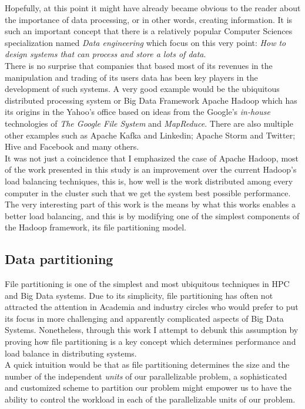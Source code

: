 Hopefully, at this point it might have already became obvious to the reader
about the importance of data processing, or in other words, creating
information. It is such an important concept that there is a relatively popular
Computer Sciences specialization named \textit{Data engineering} which focus on
this very point: \textit{How to design systems that can process and store a
lots of data}. \\

There is no surprise that companies that based most of its revenues in the
manipulation and trading of its users data has been key players in the
development of such systems. A very good example would be the ubiquitous
distributed processing system  or Big Data Framework Apache Hadoop which has its
origins in the Yahoo's office based on ideas from the Google's \textit{in-house}
technologies of \textit{The Google File System} and \textit{MapReduce}\cite{ghemawat2003google}.
There are also multiple other examples such as Apache Kafka and Linkedin; Apache
Storm and Twitter; Hive and Facebook and many others. \\

It was not just a coincidence that I emphasized the case of Apache Hadoop, most
of the work presented in this study is an improvement over the current Hadoop's
load balancing techniques, this is, how well is the work distributed among every
computer in the cluster such that we get the system best possible performance.
The very interesting part of this work is the means by what this works enables a
better load balancing, and this is by modifying one of the simplest
components of the Hadoop framework, its file partitioning model.

\subsection{Data partitioning}

File partitioning is one of the simplest and most ubiquitous techniques in HPC
and Big Data systems. Due to its simplicity, file partitioning has often
not attracted the attention in  Academia and industry circles who would prefer
to put its focus in more challenging and apparently complicated aspects of Big
Data Systems. Nonetheless, through this work I attempt to debunk this assumption
by proving how file partitioning is a key concept which determines performance and
load balance in distributing systems. \\

A quick intuition would be that as file
partitioning determines the size and the number of the independent 
\textit{units} of our parallelizable problem, a sophisticated and customized scheme 
to partition our problem might empower us to have the ability to control the
workload in each of the parallelizable units of our problem. \\

